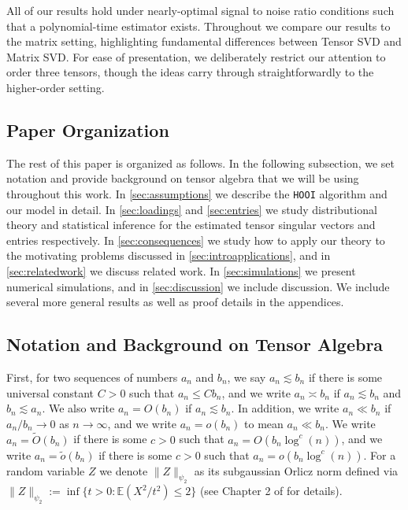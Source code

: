 \documentclass[10pt]{article}
\newcommand{\0}{{\mathbf{0}}}
\newcommand{\1}{{\mathbf{1}}}
\renewcommand{\citet}{\cite}
\renewcommand{\tilde}{\widetilde}
\begin{document}
All of our results hold under nearly-optimal signal to noise ratio conditions such that a polynomial-time estimator exists.  Throughout we compare our results to the matrix setting, highlighting fundamental differences between Tensor SVD and Matrix SVD.  For ease of presentation, we deliberately restrict our attention to order three tensors, though the ideas carry through straightforwardly to the higher-order setting.  

\subsection{Paper Organization}
The rest of this paper is organized as follows.  In the following subsection, we set notation and provide background on tensor algebra that we will be using throughout this work.  In \cref{sec:assumptions}
we describe the \texttt{HOOI} algorithm and our model in detail.  In \cref{sec:loadings} and \cref{sec:entries} we study distributional theory and statistical inference for the estimated tensor singular vectors and entries respectively.  In \cref{sec:consequences} we study how to apply our theory to the motivating problems discussed in \cref{sec:introapplications}, and in \cref{sec:relatedwork} we discuss related work.  In \cref{sec:simulations} we present numerical simulations, and in \cref{sec:discussion} we include discussion.  We include several more general results as well as proof details in the appendices.


\subsection{Notation and Background on Tensor Algebra}
\label{sec:notation}
First, for two sequences of numbers $a_n$ and $b_n$, we say $a_n \lesssim b_n$ if there is some universal constant $C> 0$ such that $a_n \leq C b_n$, and we write $a_n \asymp b_n$ if $a_n \lesssim b_n$ and $b_n \lesssim a_n$. We also write $a_n = O(b_n)$ if $a_n \lesssim b_n$. In addition, we write $a_n \ll b_n$ if $a_n/b_n \to 0$ as $n \to \infty$, and we write $a_n = o(b_n)$ to mean $a_n \ll b_n$.  We write $a_n = \tilde O(b_n)$ if there is some $c > 0$ such that $a_n = O(b_n \log^c(n))$, and we write $a_n = \tilde o(b_n)$ if there is some $c>0$ such that $a_n = o(b_n \log^c(n))$.  For a random variable $Z$ we denote $\|Z\|_{\psi_2}$ as its subgaussian Orlicz norm defined via $\|Z\|_{\psi_2} := \inf\{t >0: \mathbb{E}(X^2/t^2) \leq 2 \}$ (see Chapter 2 of \citet{vershynin_high-dimensional_2018} for details). 
\end{document}
